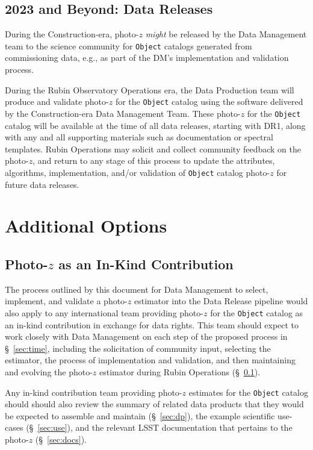 \documentclass[DM,lsstdraft,toc]{lsstdoc}
\begin{document}
\subsection{2023 and Beyond: Data Releases}\label{ssec:time_opsdr}

During the Construction-era, photo-$z$ {\it might} be released by the Data Management team to the science community for {\tt Object} catalogs generated from commissioning data, e.g., as part of the DM's implementation and validation process.

During the Rubin Observatory Operations era, the Data Production team will produce and validate photo-$z$ for the {\tt Object} catalog using the software delivered by the Construction-era Data Management Team.
These photo-$z$ for the {\tt Object} catalog will be available at the time of all data releases, starting with DR1, along with any and all supporting materials such as documentation or spectral templates.
Rubin Operations may solicit and collect community feedback on the photo-$z$, and return to any stage of this process to update the attributes, algorithms, implementation, and/or validation of {\tt Object} catalog photo-$z$ for future data releases.



\clearpage
\section{Additional Options}\label{sec:opts}

\subsection{Photo-$z$ as an In-Kind Contribution}\label{ssec:opts_inkind}

The process outlined by this document for Data Management to select, implement, and validate a photo-$z$ estimator into the Data Release pipeline would also apply to any international team providing photo-$z$ for the {\tt Object} catalog as an in-kind contribution in exchange for data rights. 
This team should expect to work closely with Data Management on each step of the proposed process in \S~\ref{sec:time}, including the solicitation of community input, selecting the estimator, the process of implementation and validation, and then maintaining and evolving the photo-$z$ estimator during Rubin Operations (\S~\ref{ssec:time_opsdr}).

Any in-kind contribution team providing photo-$z$ estimates for the {\tt Object} catalog should should also review the summary of related data products that they would be expected to assemble and maintain (\S~\ref{sec:dp}), the example scientific use-cases (\S~\ref{sec:use}), and the relevant LSST documentation that pertains to the photo-$z$ (\S~\ref{sec:docs}).
\end{document}
